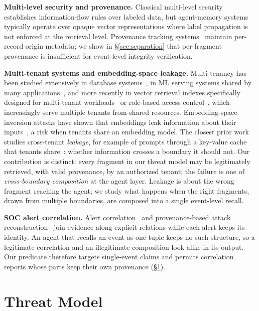 \documentclass[conference,compsoc]{IEEEtran}
\begin{document}
\textbf{Multi-level security and provenance.}
Classical multi-level security~\cite{bell1973secure,biba1977integrity} establishes information-flow rules over labeled data, but agent-memory systems typically operate over opaque vector representations where label propagation is not enforced at the retrieval level. Provenance tracking systems~\cite{pasquier2018provenance} maintain per-record origin metadata; we show in \S\ref{sec:separation} that per-fragment provenance is insufficient for event-level integrity verification.

\textbf{Multi-tenant systems and embedding-space leakage.}
Multi-tenancy has been studied extensively in database systems~\cite{aulbach2008multitenant}, in ML serving systems shared by many applications~\cite{crankshaw2017clipper}, and more recently in vector retrieval indexes specifically designed for multi-tenant workloads~\cite{jin2024curator} or role-based access control~\cite{zhong2026honeybee}, which increasingly serve multiple tenants from shared resources. Embedding-space inversion attacks have shown that embeddings leak information about their inputs~\cite{song2020embeddingleakage}, a risk when tenants share an embedding model. The closest prior work studies cross-tenant \emph{leakage}, for example of prompts through a key-value cache that tenants share~\cite{wu2025kvcache}: whether information crosses a boundary it should not. Our contribution is distinct: every fragment in our threat model may be legitimately retrieved, with valid provenance, by an authorized tenant; the failure is one of \emph{cross-boundary composition} at the agent layer. Leakage is about the wrong fragment reaching the agent; we study what happens when the right fragments, drawn from multiple boundaries, are composed into a single event-level recall.

\textbf{SOC alert correlation.}
Alert correlation~\cite{ning2002constructing,valeur2004comprehensive} and provenance-based attack reconstruction~\cite{king2003backtracking,milajerdi2019holmes} join evidence along explicit relations while each alert keeps its identity. An agent that recalls an event as one tuple keeps no such structure, so a legitimate correlation and an illegitimate composition look alike in its output. Our predicate therefore targets single-event claims and permits correlation reports whose parts keep their own provenance (\S\ref{sec:threat}).

\section{Threat Model}\label{sec:threat}
\end{document}
